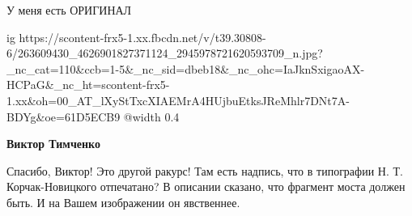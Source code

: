  
 
 
 
 

У меня есть ОРИГИНАЛ

\ifcmt
  ig https://scontent-frx5-1.xx.fbcdn.net/v/t39.30808-6/263609430_4626901827371124_2945978721620593709_n.jpg?_nc_cat=110&ccb=1-5&_nc_sid=dbeb18&_nc_ohc=IaJknSxigaoAX-HCPaG&_nc_ht=scontent-frx5-1.xx&oh=00_AT_lXyStTxcXIAEMrA4HUjbuEtksJReMhlr7DNt7A-BDYg&oe=61D5ECB9
  @width 0.4
\fi

\textbf{Виктор Тимченко} 

Спасибо, Виктор! Это другой ракурс! Там есть надпись, что в типографии Н. Т.
Корчак-Новицкого отпечатано? В описании сказано, что фрагмент моста должен
быть. И на Вашем изображении он явственнее.
